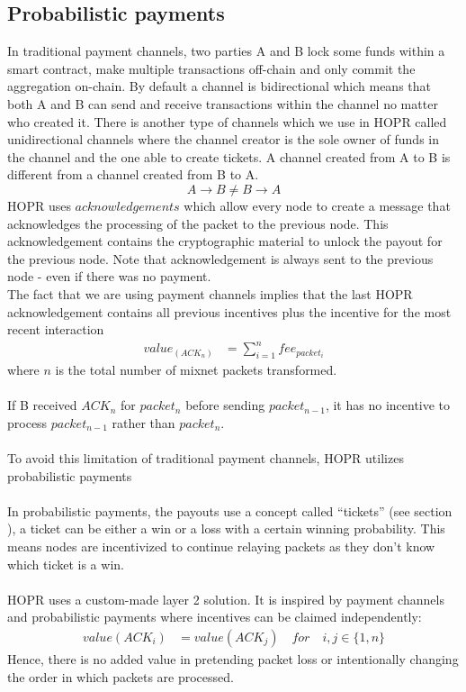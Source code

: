 \subsection{Probabilistic payments}
In traditional payment channels, two parties A and B lock some funds within a smart contract, make multiple transactions off-chain and only commit the aggregation on-chain. By default a channel is bidirectional which means that both A and B can send and receive transactions within the channel no matter who created it. There is another type of channels which we use in HOPR called unidirectional channels where the channel creator is the sole owner of funds in the channel and the one able to create tickets. A channel created from A to B is different from a channel created from B to A.
 $$A\rightarrow B \neq B\rightarrow A$$
HOPR uses $acknowledgements$ which allow every node to create a message that acknowledges the processing of the packet to the previous node. This acknowledgement contains the cryptographic material to unlock the payout for the previous node. Note that acknowledgement is always sent to the previous node - even if there was no payment.
\\The fact that we are using payment channels implies that the last HOPR acknowledgement contains all previous incentives plus the incentive for the most recent interaction
\begin{align}  
value_(ACK_n) &=\sum_{i=1}^nfee_{packet_i}
     \end{align}
where $n$ is the total number of mixnet packets transformed.
\\~\\If B received $ACK_n$ for $packet_n$ before sending $packet_{n-1}$, it has no incentive to process $packet_{n-1}$ rather than $packet_{n}$.
\\~\\To avoid this limitation of traditional payment channels, HOPR utilizes probabilistic payments
\\~\\In probabilistic payments, the payouts use a concept called “tickets” (see section ), a ticket can be either a win or a loss with a certain winning probability. This means nodes are incentivized to continue relaying packets as they don’t know which ticket is a win.
\\~\\HOPR uses a custom-made layer 2 solution. It is inspired by payment channels and probabilistic payments where incentives can be claimed independently:
\begin{align}  
 value ( ACK_i )  &  =value ( ACK_j ) \quad for \quad i,j\in \{1,n\}
         \end{align}
Hence, there is no added value in pretending packet loss or intentionally changing the order in which packets are processed.
